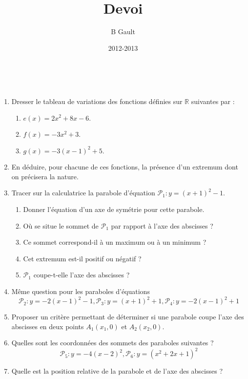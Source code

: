 \documentclass[a4paper,11pt]{article}
\title{Devoi}
\author{B Gault}
\date{2012-2013}
\theoremstyle{break}
\newcounter{numero}
\newcommand{\exo}{
  \addtocounter{numero}{1}%
  \textbf{\underline{Exercice \arabic{numero}:}}\quad}
\begin{document}
  \setlength{\unitlength}{1mm}
  \setlength\parindent{0mm}
  
  
  ~
  \medskip
  
  \begin{enumerate}
   
    
    \item Dresser le tableau de variations des fonctions définies sur $\mathbb{R}$ 
    suivantes par : 
    \begin{enumerate}
      \item $e(x)=2x^2+8x-6$.
      \item $f(x)=-3x^2+3$.
      \item $g(x)=-3(x-1)^2+5$.
    \end{enumerate}
    
    \item En déduire, pour chacune de ces fonctions, la présence d'un extremum dont on 
    précisera la nature.
    \item Tracer sur la calculatrice la parabole d'équation $\mathcal{P}_1:y=(x+1)^2-1$.
    
    \begin{enumerate}
      
      \item Donner l'équation d'un axe de symétrie pour cette parabole.
      \item Où se situe le sommet de $\mathcal{P}_1$ par rapport à l'axe des abscisses ?
      \item Ce sommet correspond-il à un maximum ou à un minimum ?
      \item Cet extremum est-il positif ou négatif ?
      \item $\mathcal{P}_1$ coupe-t-elle l'axe des abscisses ?
      
    \end{enumerate}
    
    \item Même question pour les paraboles d'équations 
    $$\mathcal{P}_2:y=-2(x-1)^2-1 ,
    \mathcal{P}_3:y=(x+1)^2+1,
    \mathcal{P}_4:y=-2(x-1)^2+1$$
    \item Proposer un critère permettant de déterminer si une parabole coupe l'axe
    des abscisses en deux points $A_1(x_1,0)$ et $A_2(x_2,0)$.
    \item Quelles sont les coordonnées des sommets des paraboles suivantes ?
    $$\mathcal{P}_5:y=-4(x-2)^2 ,
    \mathcal{P}_6:y=(x^2+2x+1)^2$$
 
    \item Quelle est la position relative de la parabole et de l'axe des abscisses ?
    
  
  \end{enumerate}
  \vspace{0.5cm}
  


 
  
  
\end{document}
